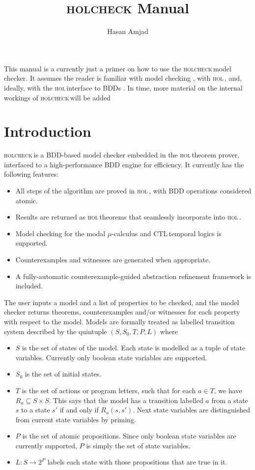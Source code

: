 \documentclass{article}
\newcommand{\ctl}{\textsf{CTL}\,}
\newcommand{\hc}{\textsc{holcheck\,}}
\newcommand{\hol}{\textsc{hol\,}}
\begin{document}
\title{\textsc{holcheck} Manual}
\author{Hasan Amjad}
\maketitle


This manual is a currently just a primer on how to use the \hc model checker. It assumes the reader is familiar with model checking \cite{Clarke1999}, with \hol \cite{HOL}, and, ideally, with the \hol interface to BDDs \cite{Gordon2002}. In time, more material on the internal workings of \hc will be added

\section{Introduction}\label{sec:intro}

\hc is a BDD-based model checker embedded in the \hol theorem prover, interfaced to a high-performance BDD engine for efficiency. It currently has the following features:

\begin{itemize}
\item All steps of the algorithm are proved in \hol, with BDD operations considered atomic.
\item Results are returned as \hol theorems that seamlessly incorporate into \hol.
\item Model checking for the modal \(\mu\)-calculus and \ctl temporal logics is supported.
\item Counterexamples and witnesses are generated when appropriate.
\item A fully-automatic counterexample-guided abstraction refinement framework is included.  
\end{itemize}

The user inputs a model and a list of properties to be checked, and the model checker returns theorems, counterexamples and/or witnesses for each property with respect to the model. Models are formally treated as labelled transition system described by the quintuple \( (S, S_0, T, P, L) \) where 

\begin{itemize}
\item \( S \) is the set of states of the model. Each state is modelled as a tuple of state variables. Currently only boolean state variables are supported.
\item \( S_0\) is the set of initial states.
\item \( T \) is the set of actions or program letters, such that for each \( a \in T \), we have \( R_a \subseteq S \times S\). This says that the model has a transition labelled \( a \) from a state \( s \) to a state \( s' \) if and only if \( R_a(s,s') \). Next state variables are distinguished from current state variables by priming. 
\item \( P \) is the set of atomic propositions. Since only boolean state variables are currently supported, \( P \) is simply the set of state variables.
\item \( L:S\rightarrow 2^P \) labels each state with those propositions that are true in it.   
\end{itemize}
\end{document}
